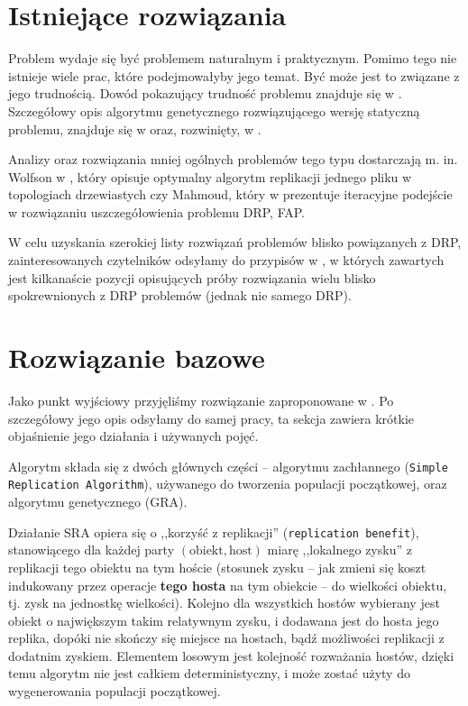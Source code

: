 \documentclass[11pt,pdftex,a4paper]{scrartcl}
\begin{document}
\section{Istniejące rozwiązania}
Problem wydaje się być problemem naturalnym i praktycznym. Pomimo tego nie istnieje wiele prac, które podejmowałyby jego temat. Być może jest to związane z jego trudnością. Dowód pokazujący trudność problemu znajduje się w \cite{newAhmad}. Szczegółowy opis algorytmu genetycznego rozwiązującego wersję statyczną problemu, znajduje się w \cite{Ahmad} oraz, rozwinięty, w \cite{newAhmad}.

Analizy oraz rozwiązania mniej ogólnych problemów tego typu dostarczają m. in. Wolfson w \cite{Wolfson}, który opisuje optymalny algorytm replikacji jednego pliku w topologiach drzewiastych czy Mahmoud, który w \cite{Mahmoud} prezentuje iteracyjne podejście w rozwiązaniu uszczegółowienia problemu DRP, FAP.

W celu uzyskania szerokiej listy rozwiązań problemów blisko powiązanych z DRP, zainteresowanych czytelników odsyłamy do przypisów w \cite{newAhmad}, w których zawartych jest kilkanaście pozycji opisujących próby rozwiązania wielu blisko spokrewnionych z DRP problemów (jednak nie samego DRP).

\section{Rozwiązanie bazowe}
Jako punkt wyjściowy przyjęliśmy rozwiązanie zaproponowane w \cite{Ahmad}. Po szczegółowy jego opis
odsyłamy do samej pracy, ta sekcja zawiera krótkie objaśnienie jego działania i używanych pojęć.

Algorytm składa się z dwóch głównych części -- algorytmu zachłannego (\texttt{Simple Replication 
Algorithm}), używanego do tworzenia populacji początkowej, oraz algorytmu genetycznego (GRA).

Działanie SRA opiera się o ,,korzyść z replikacji'' (\texttt{replication benefit}), stanowiącego
dla każdej party \((\textrm{obiekt}, \textrm{host})\) miarę ,,lokalnego zysku'' z replikacji tego
obiektu na tym hoście (stosunek zysku -- jak zmieni się koszt indukowany przez operacje 
\textbf{tego hosta} na tym obiekcie -- do wielkości obiektu, tj. zysk na jednostkę wielkości).
Kolejno dla wszystkich hostów wybierany jest obiekt o największym takim relatywnym zysku, i dodawana
jest do hosta jego replika, dopóki nie skończy się miejsce na hostach, bądź możliwości replikacji
z dodatnim zyskiem. Elementem losowym jest kolejność rozważania hostów, dzięki temu algorytm
nie jest całkiem deterministyczny, i może zostać użyty do wygenerowania populacji początkowej.
\end{document}

